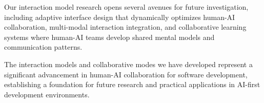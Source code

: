 Our interaction model research opens several avenues for future investigation, including adaptive interface design that dynamically optimizes human-AI collaboration, multi-modal interaction integration, and collaborative learning systems where human-AI teams develop shared mental models and communication patterns.

The interaction models and collaborative modes we have developed represent a significant advancement in human-AI collaboration for software development, establishing a foundation for future research and practical applications in AI-first development environments.
